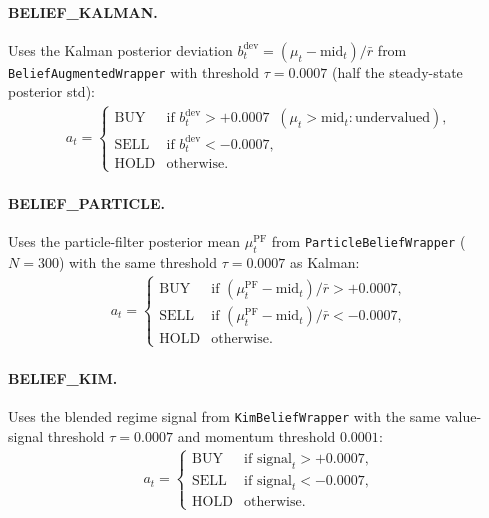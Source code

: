 \documentclass[11pt]{article}
\begin{document}
\paragraph{BELIEF\_KALMAN.}
Uses the Kalman posterior deviation $b_t^{\text{dev}} = (\mu_t - \text{mid}_t)/\bar{r}$
from \texttt{BeliefAugmentedWrapper} with threshold $\tau = 0.0007$
(half the steady-state posterior std):
\begin{align*}
a_t = \begin{cases}
\text{BUY}  & \text{if } b_t^{\text{dev}} > +0.0007 \;\; (\mu_t > \text{mid}_t: \text{undervalued}), \\
\text{SELL} & \text{if } b_t^{\text{dev}} < -0.0007, \\
\text{HOLD} & \text{otherwise.}
\end{cases}
\end{align*}

\paragraph{BELIEF\_PARTICLE.}
Uses the particle-filter posterior mean $\mu_t^{\text{PF}}$ from
\texttt{ParticleBeliefWrapper} ($N=300$) with the same threshold
$\tau = 0.0007$ as Kalman:
\begin{align*}
a_t = \begin{cases}
\text{BUY}  & \text{if } (\mu_t^{\text{PF}} - \text{mid}_t)/\bar{r} > +0.0007, \\
\text{SELL} & \text{if } (\mu_t^{\text{PF}} - \text{mid}_t)/\bar{r} < -0.0007, \\
\text{HOLD} & \text{otherwise.}
\end{cases}
\end{align*}

\paragraph{BELIEF\_KIM.}
Uses the blended regime signal from \texttt{KimBeliefWrapper}
with the same value-signal threshold $\tau = 0.0007$ and momentum
threshold $0.0001$:
\begin{align*}
a_t = \begin{cases}
\text{BUY}  & \text{if } \text{signal}_t > +0.0007, \\
\text{SELL} & \text{if } \text{signal}_t < -0.0007, \\
\text{HOLD} & \text{otherwise.}
\end{cases}
\end{align*}
\end{document}
